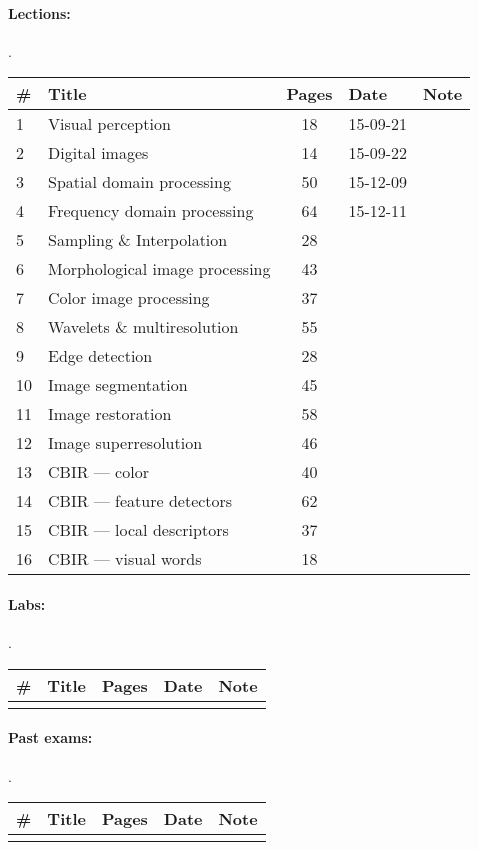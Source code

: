 \documentclass[a4paper,12pt]{article} %
\begin{document}
\paragraph{Lections:} .\\
\begin{tabularx}{\textwidth}{|l|X|c|l|c|}
	\hline
	\# & Title & Pages & Date & Note \\
	\hline
	1 & Visual perception & 18 & 15-09-21 &  \\
	\hline
	2 & Digital images & 14 & 15-09-22 &  \\
	\hline
	3 & Spatial domain processing & 50 & 15-12-09 &  \\
	\hline
	4 & Frequency domain processing & 64 & 15-12-11 &  \\
	\hline
	5 & Sampling \& Interpolation & 28 &  &  \\
	\hline
	6 & Morphological image processing & 43 &  &  \\
	\hline
	7 & Color image processing & 37 &  &  \\
	\hline
	8 & Wavelets \& multiresolution & 55 &  &  \\
	\hline
	9 & Edge detection & 28 &  &  \\
	\hline
	10 & Image segmentation & 45 &  &  \\
	\hline
	11 & Image restoration & 58 &  &  \\
	\hline
	12 & Image superresolution & 46 &  &  \\
	\hline
	13 & CBIR --- color & 40 &  &  \\
	\hline
	14 & CBIR --- feature detectors & 62 &  &  \\
	\hline
	15 & CBIR --- local descriptors & 37 &  &  \\
	\hline
	16 & CBIR --- visual words & 18 &  &  \\
	\hline
\end{tabularx}

\paragraph{Labs:}.\\
\begin{tabularx}{\textwidth}{|l|X|c|l|c|}
	\hline
	\# & Title & Pages & Date & Note \\
	\hline
	&  &  &  &  \\
	\hline
\end{tabularx}

\paragraph{Past exams:}.\\
\begin{tabularx}{\textwidth}{|l|X|c|l|c|}
	\hline
	\# & Title & Pages & Date & Note \\
	\hline
	&  &  &  &  \\
	\hline
\end{tabularx}
\end{document}
